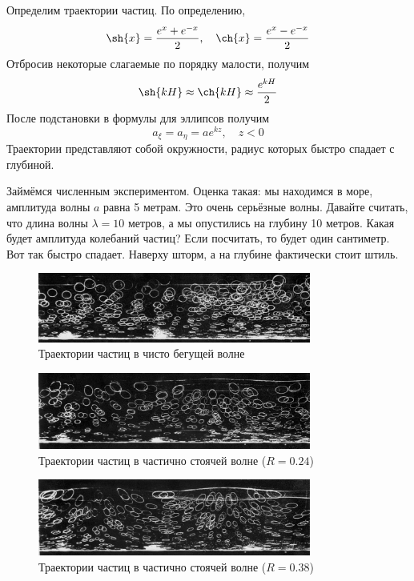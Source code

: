 Определим траектории частиц. По определению, 
\begin{equation}
    \sh{x} = \frac{e^x+e^{-x}}{2}, \quad \ch{x} = \frac{e^x-e^{-x}}{2}
\end{equation}
Отбросив некоторые слагаемые по порядку малости, получим
\begin{equation}
    \sh{kH}\approx\ch{kH}\approx \frac{e^{kH}}{2} 
\end{equation}
После подстановки в формулы для эллипсов получим
\begin{equation}
    a_\xi = a_\eta = ae^{kz}, \quad z<0
\end{equation}
Траектории представляют собой окружности, радиус которых быстро спадает с глубиной. 

Займёмся численным экспериментом. 
Оценка такая: мы находимся в море, амплитуда волны $a$ равна 5 метрам.
Это очень серьёзные волны. 
Давайте считать, что длина волны $\lambda=10$  метров, а мы опустились на глубину 10 метров.
Какая будет амплитуда колебаний частиц? Если посчитать, то будет один сантиметр. Вот так быстро спадает. Наверху шторм, а на глубине фактически стоит штиль.

\begin{figure}[H]
    \centering
    \includegraphics[width=0.8\textwidth]{photo/ppw.png}
    \caption{Траектории частиц в чисто бегущей волне}
    \label{fig:ppw}
\end{figure}

\begin{figure}[H]
    \centering
    \includegraphics[width=0.8\textwidth]{photo/ppw3.png}
    \caption{Траектории частиц в частично стоячей волне ($R=0.24$)}
    \label{fig:ppw3}
\end{figure}

\begin{figure}[H]
    \centering
    \includegraphics[width=0.8\textwidth]{photo/ppw2.png}
    \caption{Траектории частиц в частично стоячей волне ($R=0.38$)}
    \label{fig:ppw2}
\end{figure}


